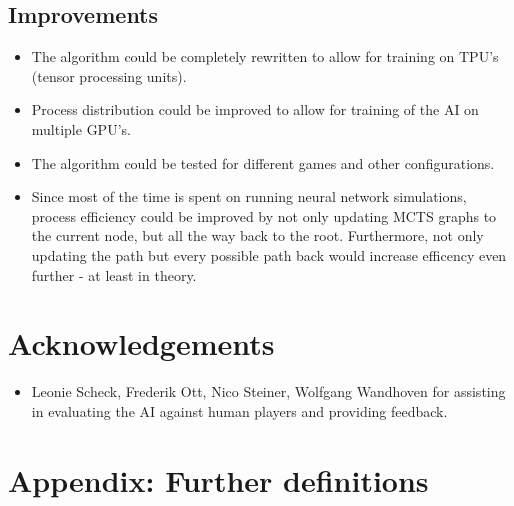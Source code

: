 \documentclass[12pt]{article}
\begin{document}
\subsection{Improvements}
\begin{itemize}
\item The algorithm could be completely rewritten to allow for training on TPU's (tensor processing units).
\item Process distribution could be improved to allow for training of the AI on multiple GPU's.
\item The algorithm could be tested for different games and other configurations.
\item Since most of the time is spent on running neural network simulations, process efficiency could be improved by not only updating MCTS graphs to the current node, but all the way back to the root. Furthermore, not only updating the path but every possible path back would increase efficency even further - at least in theory. 
\end{itemize}

\newpage



\newpage
\section*{Acknowledgements}
\begin{itemize}
\item Leonie Scheck, Frederik Ott, Nico Steiner, Wolfgang Wandhoven for assisting in evaluating the AI against human players and providing feedback.
\end{itemize}

\newpage
\section{Appendix: Further definitions}
\end{document}

